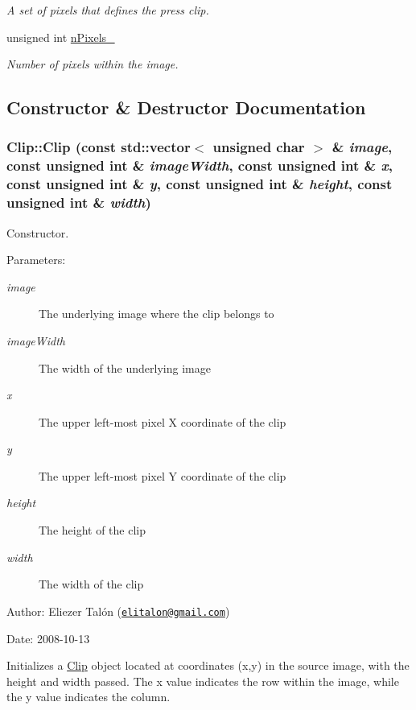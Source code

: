 \begin{CompactItemize}
\begin{CompactList}\small\item\em A set of pixels that defines the press clip. \item\end{CompactList}\item 
\hypertarget{class_clip_7e2bd80cd0cc06f6d4c3ebe6a22c573d}{
unsigned int \hyperlink{class_clip_7e2bd80cd0cc06f6d4c3ebe6a22c573d}{nPixels\_\-}}
\label{class_clip_7e2bd80cd0cc06f6d4c3ebe6a22c573d}

\begin{CompactList}\small\item\em Number of pixels within the image. \item\end{CompactList}\end{CompactItemize}


\subsection{Constructor \& Destructor Documentation}
\hypertarget{class_clip_bcda5a8d32fda0933bce32d6d9f2c5a1}{
\subsubsection[Clip]{\setlength{\rightskip}{0pt plus 5cm}Clip::Clip (const std::vector$<$ unsigned char $>$ \& {\em image}, \/  const unsigned int \& {\em imageWidth}, \/  const unsigned int \& {\em x}, \/  const unsigned int \& {\em y}, \/  const unsigned int \& {\em height}, \/  const unsigned int \& {\em width})}}
\label{class_clip_bcda5a8d32fda0933bce32d6d9f2c5a1}


Constructor. 

\begin{Desc}
\item[Parameters:]
\begin{description}
\item[{\em image}]The underlying image where the clip belongs to \item[{\em imageWidth}]The width of the underlying image \item[{\em x}]The upper left-most pixel X coordinate of the clip \item[{\em y}]The upper left-most pixel Y coordinate of the clip \item[{\em height}]The height of the clip \item[{\em width}]The width of the clip\end{description}
\end{Desc}
\begin{Desc}
\item[Author:]Eliezer Talón (\href{mailto:elitalon@gmail.com}{\tt elitalon@gmail.com}) \end{Desc}
\begin{Desc}
\item[Date:]2008-10-13\end{Desc}
Initializes a \hyperlink{class_clip}{Clip} object located at coordinates (x,y) in the source image, with the height and width passed. The x value indicates the row within the image, while the y value indicates the column. 

